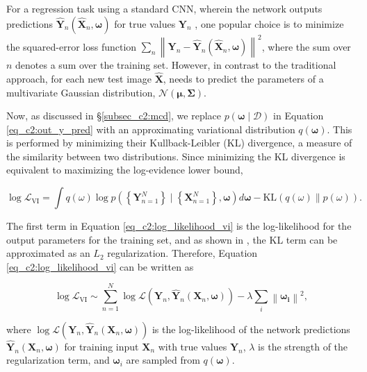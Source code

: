 \sloppy For a regression task using a standard CNN, wherein the network outputs predictions  $\hat{\boldsymbol{Y}}_{n}\left(\boldsymbol{\hat{X}}_{n}, \boldsymbol{\omega}\right)$ for true values $\boldsymbol{Y}_{n}$ , one popular choice is to minimize the squared-error loss function $\sum_{n} \left\|\boldsymbol{Y}_n-\boldsymbol{\hat{Y}}_n\left(\boldsymbol{\hat{X}}_n, \boldsymbol{\omega}\right)\right\|^{2}$, where the sum over $n$ denotes a sum over the training set. However, in contrast to the traditional approach, for each new test image $\boldsymbol{\hat{X}}$, \gampen{} needs to predict the parameters of a multivariate Gaussian distribution, $\mathcal{N}(\boldsymbol{\mu}, \boldsymbol{\Sigma})$. 

Now, as discussed in \S \ref{subsec_c2:mcd}, we replace $p(\boldsymbol{\omega} \mid \mathcal{D})$ in Equation \ref{eq_c2:out_y_pred} with an approximating variational distribution $q(\boldsymbol{\omega})$. This is performed by minimizing their Kullback-Leibler (KL) divergence, a measure of the similarity between two distributions. Since minimizing the KL divergence is equivalent to maximizing the log-evidence lower bound,

\begin{equation}
\log \mathcal{L}_{\mathrm{VI}}= \int q(\omega) \log p( \left\{\boldsymbol{Y}_{n=1}^{N}\right\} \mid \left\{\boldsymbol{X}_{n=1}^N\right\}, \boldsymbol{\omega}) d \boldsymbol{\omega}  - \mathrm{KL}(q(\omega) \| p(\omega)) .
\label{eq_c2:log_likelihood_vi}
\end{equation}

\noindent
The first term in Equation \ref{eq_c2:log_likelihood_vi} is the log-likelihood for the output parameters for the training set, and as shown in \cite{gal_2016}, the KL term can be approximated as an $L_2$ regularization. Therefore, Equation \ref{eq_c2:log_likelihood_vi} can be written as 

\begin{equation}
\log \mathcal{L}_{\mathrm{VI}} \sim \sum_{n=1}^{N} \log \mathcal{L}\left(\boldsymbol{Y}_{n}, \boldsymbol{\hat{Y}}_{n}\left(\boldsymbol{X}_{n}, \boldsymbol{\omega}\right)\right)-\lambda \sum_{i}\left\|\boldsymbol{\omega_{i}}\right\|^{2} ,
\label{eq_c2:log_likelihood_vi_2}
\end{equation}

\noindent
where $\log \mathcal{L}\left(\boldsymbol{Y}_{n}, \boldsymbol{\hat{Y}}_{n}\left(\boldsymbol{X}_{n}, \boldsymbol{\omega}\right)\right)$ is the log-likelihood of the network predictions $\boldsymbol{\hat{Y}}_{n}\left(\boldsymbol{X}_{n}, \boldsymbol{\omega}\right)$ for training input $\boldsymbol{X}_n$ with true values $\boldsymbol{Y}_n$, $\lambda$ is the strength of the regularization term, and $\boldsymbol{\omega}_i$ are sampled from $q(\boldsymbol{\omega})$. 

